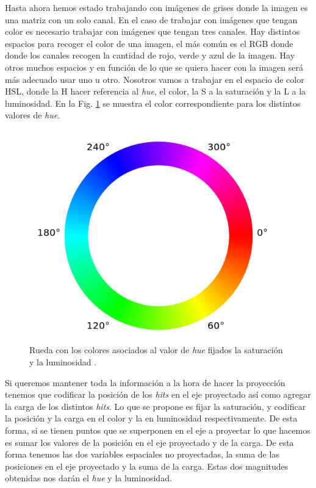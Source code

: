 \documentclass[a4paper,12pt,twoside,titlepage]{article}
\begin{document}
Hasta ahora hemos estado trabajando con imágenes de grises donde la imagen es una matriz con un solo canal. En el caso de trabajar con imágenes que tengan color es necesario trabajar con imágenes que tengan tres canales. Hay distintos espacios para recoger el color de una imagen, el más común es el RGB donde donde los canales recogen la cantidad de rojo, verde y azul de la imagen. Hay otros muchos espacios y en función de lo que se quiera hacer con la imagen será más adecuado usar uno u otro. Nosotros vamos a trabajar en el espacio de color HSL, donde la H hacer referencia al \textit{hue}, el color, la S a la saturación y la L a la luminosidad. En la Fig. \ref{fig:hue} se muestra el color correspondiente para los distintos valores de \textit{hue}. 

\begin{figure}[h!]
  \centering
  \includegraphics[scale=0.45]{h-colours.png}
  \caption{Rueda con los colores asociados al valor de \textit{hue} fijados la saturación y la luminosidad \cite{hue_page}.}
  \label{fig:hue}
\end{figure}

Si queremos mantener toda la información a la hora de hacer la proyección tenemos que codificar la posición de los \textit{hits} en el eje proyectado así como agregar la carga de los distintos \textit{hits}. Lo que se propone es fijar la saturación, y codificar la posición y la carga en el color y la en luminosidad respectivamente. De esta forma, si se tienen puntos que se superponen en el eje a proyectar lo que hacemos es sumar los valores de la posición en el eje proyectado y de la carga. De esta forma tenemos las dos variables espaciales no proyectadas, la suma de las posiciones en el eje proyectado y la suma de la carga. Estas dos magnitudes obtenidas nos darán el \textit{hue} y la luminosidad.
\end{document}
